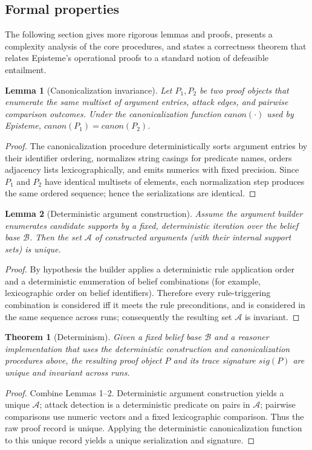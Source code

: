 \documentclass[11pt]{article}
\newtheorem{theorem}{Theorem}
\newtheorem{lemma}{Lemma}
\begin{document}
\subsection{Formal properties}
The following section gives more rigorous lemmas and proofs, presents a complexity
analysis of the core procedures, and states a correctness theorem that relates
Episteme's operational proofs to a standard notion of defeasible entailment.

\begin{lemma}[Canonicalization invariance]
Let $P_1,P_2$ be two proof objects that enumerate the same multiset of argument
entries, attack edges, and pairwise comparison outcomes. Under the canonicalization
function $\mathit{canon}(\cdot)$ used by Episteme, $\mathit{canon}(P_1)=\mathit{canon}(P_2)$.
\end{lemma}
\begin{proof}
The canonicalization procedure deterministically sorts argument entries by their
identifier ordering, normalizes string casings for predicate names, orders adjacency
lists lexicographically, and emits numerics with fixed precision. Since $P_1$ and
$P_2$ have identical multisets of elements, each normalization step produces the
same ordered sequence; hence the serializations are identical.
\end{proof}

\begin{lemma}[Deterministic argument construction]
Assume the argument builder enumerates candidate supports by a fixed, deterministic
iteration over the belief base $\mathcal{B}$. Then the set $\mathcal{A}$ of
constructed arguments (with their internal support sets) is unique.
\end{lemma}
\begin{proof}
By hypothesis the builder applies a deterministic rule application order and a
deterministic enumeration of belief combinations (for example, lexicographic order
on belief identifiers). Therefore every rule-triggering combination is considered
iff it meets the rule preconditions, and is considered in the same sequence across
runs; consequently the resulting set $\mathcal{A}$ is invariant.
\end{proof}

\begin{theorem}[Determinism]
Given a fixed belief base $\mathcal{B}$ and a reasoner implementation that uses the
deterministic construction and canonicalization procedures above, the resulting
proof object $P$ and its trace signature $\mathit{sig}(P)$ are unique and
invariant across runs.
\end{theorem}
\begin{proof}
Combine Lemmas 1--2. Deterministic argument construction yields a unique $\mathcal{A}$;
attack detection is a deterministic predicate on pairs in $\mathcal{A}$; pairwise
comparisons use numeric vectors and a fixed lexicographic comparison. Thus the
raw proof record is unique. Applying the deterministic canonicalization function
to this unique record yields a unique serialization and signature.
\end{proof}
\end{document}
